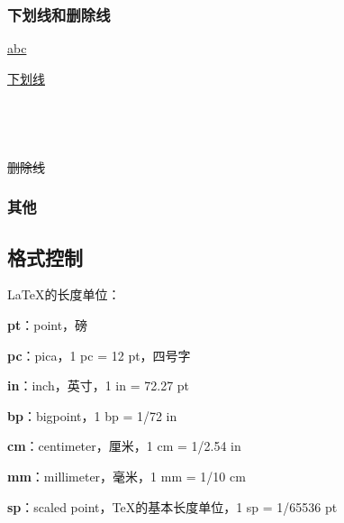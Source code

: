 \documentclass{ctexart}
\begin{document}
	    \subsubsection{下划线和删除线}
            \underline{abc} 
		
            \uline{下划线}\\
            \\
            \\
            \\
            \\
            \sout{删除线}\\

        \subsubsection{其他}
    
    \subsection{格式控制}
            \LaTeX 的长度单位：

            \textbf{pt}：point，磅

            \textbf{pc}：pica，1 pc = 12 pt，四号字

            \textbf{in}：inch，英寸，1 in = 72.27 pt

            \textbf{bp}：bigpoint，1 bp = 1/72 in

            \textbf{cm}：centimeter，厘米，1 cm = 1/2.54 in

            \textbf{mm}：millimeter，毫米，1 mm = 1/10 cm

            \textbf{sp}：scaled point，\TeX 的基本长度单位，1 sp = 1/65536 pt
\end{document}
